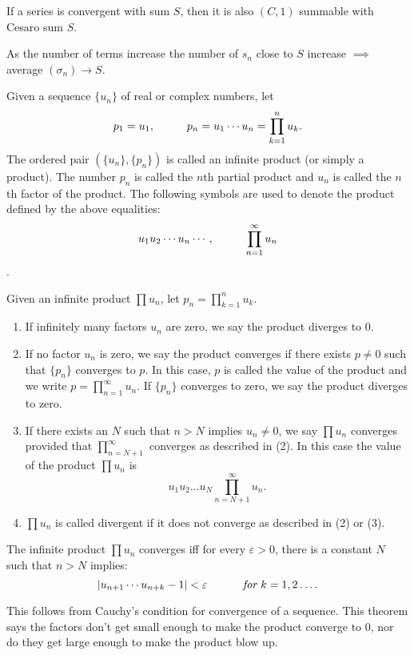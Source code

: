 \documentclass[10pt,a4paper]{book}
\begin{document}
\begin{Thm}
If a series is convergent with sum $S$, then it is also $(C,1)$ summable with Cesaro sum $S$. 
\end{Thm}
\PP As the number of terms increase the number of $s_n$ close to $S$ increase $\implies$ average $(\sigma_n)\rightarrow S$. 

\begin{deff}
Given a sequence $\{u_n\}$ of real or complex numbers, let 
$$ p_1 = u_1,\sp p_n = u_1 \cdots u_n = \prod_{k=1}^n u_k.$$
The ordered pair $(\{u_n\}, \{p_n\})$ is called an infinite product (or simply a product). The number $p_n$ is called the $n$th partial product and $u_n$ is called the $n$th factor of the product. The following symbols are used to denote the product defined by the above equalities:
$$u_1u_2 \cdots u_n \cdots, \sp \prod_{n=1}^\infty u_n$$.
\end{deff}
\begin{deff}
Given an infinite product $\prod u_n$, let $p_n = \prod_{k=1}^n u_k$.
\begin{enumerate}
    \item If infinitely many factors $u_n$ are zero, we say the product diverges to $0$.
    
    \item If no factor $u_n$ is zero, we say the product converges if there exists $p \neq 0$ such that $\{p_n\}$ converges to $p$. In this case, $p$ is called the value of the product and we write $p= \prod_{n=1}^\infty u_n$. If $\{p_n\}$ converges to zero, we say the product diverges to zero.
    \item If there exists an $N$ such that $n>N$ implies $u_n \neq 0$, we say $\prod u_n$ converges provided that $\prod_{n=N+1}^\infty$ converges as described in (2). In this case the value of the product $\prod u_n$ is
    $$u_1u_2 \dots u_N\prod_{n=N+1}^\infty u_n.$$
    \item $\prod u_n$ is called divergent if it does not converge as described in (2) or (3).
\end{enumerate}
\end{deff}
\begin{Thm}
The infinite product $\prod u_n$ converges iff for every $\varepsilon >0$, there is a constant $N$ such that $n>N$ implies:
$$|u_{n+1}\cdots u_{n+k} -1| < \varepsilon \sp \textit{ for } k =1,2 \dots.$$

\end{Thm}
\PP This follows from Cauchy's condition for convergence of a sequence. This theorem says the factors don't get small enough to make the product converge to 0, nor do they get large enough to make the product blow up.
\end{document}

